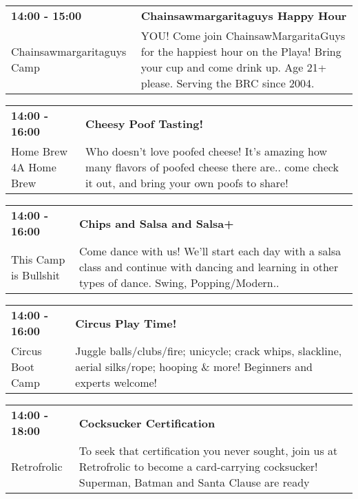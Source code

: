 \begin{tabular}{ p{1in} p{2.2in} }
    \textbf{14:00 - 15:00} & \textbf{Chainsawmargaritaguys Happy Hour} \\
    Chainsawmargaritaguys Camp \newline  & YOU! Come join ChainsawMargaritaGuys for the happiest hour on the Playa! Bring your cup and come drink up. Age 21+ please. Serving the BRC since 2004. \\
    \hline 
\end{tabular}
    
\begin{tabular}{ p{1in} p{2.2in} }
    \textbf{14:00 - 16:00} & \textbf{Cheesy Poof Tasting!} \\
    Home Brew 4A Home Brew \newline  & Who doesn't love poofed cheese! It's amazing how many flavors of poofed cheese there are.. come check it out, and bring your own poofs to share! \\
    \hline 
\end{tabular}
    
\begin{tabular}{ p{1in} p{2.2in} }
    \textbf{14:00 - 16:00} & \textbf{Chips and Salsa and Salsa+} \\
    This Camp is Bullshit \newline  & Come dance with us!  We'll start each day with a salsa class and continue with dancing and learning in other types of dance.  Swing, Popping/Modern.. \\
    \hline 
\end{tabular}
    
\begin{tabular}{ p{1in} p{2.2in} }
    \textbf{14:00 - 16:00} & \textbf{Circus Play Time!} \\
    Circus Boot Camp \newline  & Juggle balls/clubs/fire; unicycle; crack whips, slackline, aerial silks/rope; hooping \& more! Beginners and experts welcome! \\
    \hline 
\end{tabular}
    
\begin{tabular}{ p{1in} p{2.2in} }
    \textbf{14:00 - 18:00} & \textbf{Cocksucker Certification} \\
    Retrofrolic \newline  & To seek that certification you never sought, join us at Retrofrolic to become a card-carrying cocksucker!  Superman, Batman and Santa Clause are ready \\
    \hline 
\end{tabular}
    
